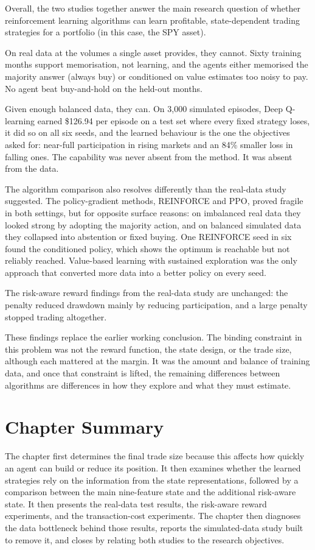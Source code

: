 Overall, the two studies together answer the main research question of
whether reinforcement learning algorithms can learn profitable,
state-dependent trading strategies for a portfolio (in this case, the
SPY asset).

On real data at the volumes a single asset provides, they cannot. Sixty
training months support memorisation, not learning, and the agents
either memorised the majority answer (always buy) or conditioned on
value estimates too noisy to pay. No agent beat buy-and-hold on the
held-out months.

Given enough balanced data, they can. On 3,000 simulated episodes, Deep
Q-learning earned \$126.94 per episode on a test set where every fixed
strategy loses, it did so on all six seeds, and the learned behaviour is
the one the objectives asked for: near-full participation in rising
markets and an 84\% smaller loss in falling ones. The capability was
never absent from the method. It was absent from the data.

The algorithm comparison also resolves differently than the real-data
study suggested. The policy-gradient methods, REINFORCE and PPO, proved
fragile in both settings, but for opposite surface reasons: on
imbalanced real data they looked strong by adopting the majority action,
and on balanced simulated data they collapsed into abstention or fixed
buying. One REINFORCE seed in six found the conditioned policy, which
shows the optimum is reachable but not reliably reached. Value-based
learning with sustained exploration was the only approach that converted
more data into a better policy on every seed.

The risk-aware reward findings from the real-data study are unchanged:
the penalty reduced drawdown mainly by reducing participation, and a
large penalty stopped trading altogether.

These findings replace the earlier working conclusion. The binding
constraint in this problem was not the reward function, the state
design, or the trade size, although each mattered at the margin. It was
the amount and balance of training data, and once that constraint is
lifted, the remaining differences between algorithms are differences in
how they explore and what they must estimate.

\section{Chapter Summary}

The chapter first determines the final trade size because this affects
how quickly an agent can build or reduce its position. It then examines
whether the learned strategies rely on the information from the state
representations, followed by a comparison between the main nine-feature
state and the additional risk-aware state. It then presents the
real-data test results, the risk-aware reward experiments, and the
transaction-cost experiments. The chapter then diagnoses the data
bottleneck behind those results, reports the simulated-data study built
to remove it, and closes by relating both studies to the research
objectives.

